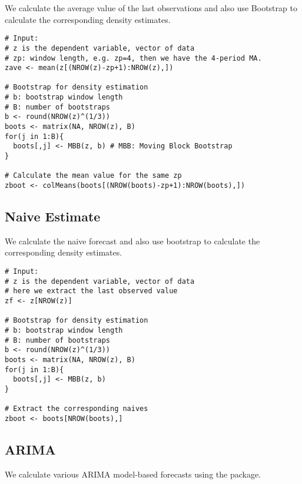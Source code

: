 \documentclass[12pt]{article}
\begin{document}
We calculate the average value of the last observations and also use Bootstrap
to calculate the corresponding density estimates.

\begin{lstlisting}[title=\textbf{Averaging and Bootstrap for density.}]
# Input: 
# z is the dependent variable, vector of data
# zp: window length, e.g. zp=4, then we have the 4-period MA.
zave <- mean(z[(NROW(z)-zp+1):NROW(z),])

# Bootstrap for density estimation
# b: bootstrap window length
# B: number of bootstraps
b <- round(NROW(z)^(1/3))
boots <- matrix(NA, NROW(z), B)
for(j in 1:B){
  boots[,j] <- MBB(z, b) # MBB: Moving Block Bootstrap
}

# Calculate the mean value for the same zp
zboot <- colMeans(boots[(NROW(boots)-zp+1):NROW(boots),])
\end{lstlisting}

\subsection{Naive Estimate \textendash{} {\href{https://github.com/eurostat/econowcast/blob/master/nowcast/naive.R}{}}}

We calculate the naive forecast and also use bootstrap to calculate the
corresponding density estimates.

\begin{lstlisting}[title=\textbf{Naive forecasting.}]
# Input: 
# z is the dependent variable, vector of data
# here we extract the last observed value
zf <- z[NROW(z)]

# Bootstrap for density estimation
# b: bootstrap window length
# B: number of bootstraps
b <- round(NROW(z)^(1/3))
boots <- matrix(NA, NROW(z), B)
for(j in 1:B){
  boots[,j] <- MBB(z, b)
}

# Extract the corresponding naives
zboot <- boots[NROW(boots),]
\end{lstlisting}

\subsection{ARIMA \textendash{} {\href{https://github.com/eurostat/econowcast/blob/master/nowcast/ar.R}{}}}

We calculate various ARIMA model-based forecasts using the  package.
\end{document}
